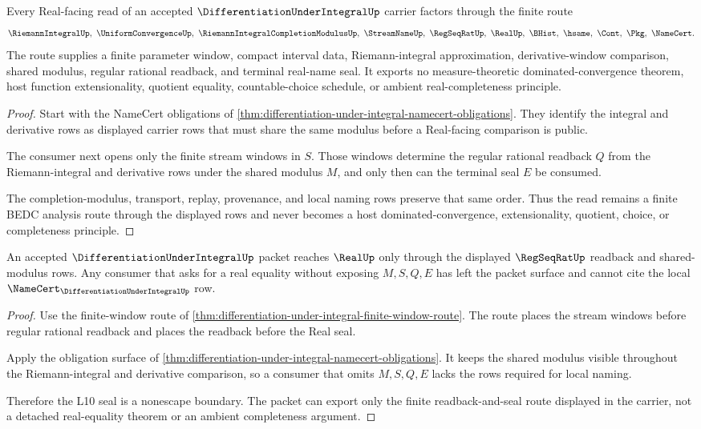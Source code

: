 \begin{theorem}
\label{thm:differentiation-under-integral-finite-window-route}
Every Real-facing read of an accepted $\DifferentiationUnderIntegralUp$ carrier factors through the finite route
$$
\RiemannIntegralUp,\ \UniformConvergenceUp,\ \RiemannIntegralCompletionModulusUp,\ \StreamNameUp,\ \RegSeqRatUp,\ \RealUp,\ \BHist,\ \hsame,\ \Cont,\ \Pkg,\ \NameCert .
$$
The route supplies a finite parameter window, compact interval data, Riemann-integral approximation, derivative-window comparison, shared modulus, regular rational readback, and terminal real-name seal. It exports no measure-theoretic dominated-convergence theorem, host function extensionality, quotient equality, countable-choice schedule, or ambient real-completeness principle.
\end{theorem}
\begin{proof}
Start with the NameCert obligations of \autoref{thm:differentiation-under-integral-namecert-obligations}. They identify the integral and derivative rows as displayed carrier rows that must share the same modulus before a Real-facing comparison is public.

The consumer next opens only the finite stream windows in $S$. Those windows determine the regular rational readback $Q$ from the Riemann-integral and derivative rows under the shared modulus $M$, and only then can the terminal seal $E$ be consumed.

The completion-modulus, transport, replay, provenance, and local naming rows preserve that same order. Thus the read remains a finite BEDC analysis route through the displayed rows and never becomes a host dominated-convergence, extensionality, quotient, choice, or completeness principle.
\end{proof}

\begin{theorem}
\label{thm:differentiation-under-integral-l10-seal-nonescape}
An accepted $\DifferentiationUnderIntegralUp$ packet reaches $\RealUp$ only through the displayed $\RegSeqRatUp$ readback and shared-modulus rows. Any consumer that asks for a real equality without exposing $M,S,Q,E$ has left the packet surface and cannot cite the local $\NameCert_{\DifferentiationUnderIntegralUp}$ row.
\end{theorem}
\begin{proof}
Use the finite-window route of \autoref{thm:differentiation-under-integral-finite-window-route}. The route places the stream windows before regular rational readback and places the readback before the Real seal.

Apply the obligation surface of \autoref{thm:differentiation-under-integral-namecert-obligations}. It keeps the shared modulus visible throughout the Riemann-integral and derivative comparison, so a consumer that omits $M,S,Q,E$ lacks the rows required for local naming.

Therefore the L10 seal is a nonescape boundary. The packet can export only the finite readback-and-seal route displayed in the carrier, not a detached real-equality theorem or an ambient completeness argument.
\end{proof}

